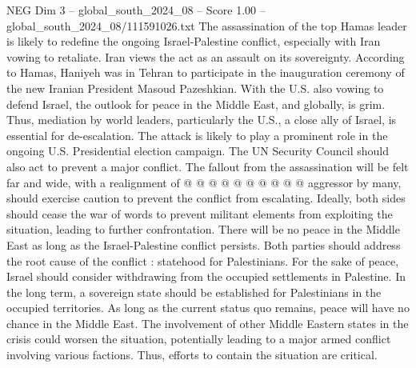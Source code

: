 \begin{textsample}{NEG Dim 3 – global\_south\_2024\_08 – Score 1.00 – global\_south\_2024\_08/111591026.txt}
The assassination of the top Hamas leader is likely to redefine the ongoing Israel-Palestine conflict, especially with Iran vowing to retaliate.
Iran views the act as an assault on its sovereignty.
According to Hamas, Haniyeh was in Tehran to participate in the inauguration ceremony of the new Iranian President Masoud Pazeshkian.
With the U.S. also vowing to defend Israel, the outlook for peace in the Middle East, and globally, is grim.
Thus, mediation by world leaders, particularly the U.S., a close ally of Israel, is essential for de-escalation.
The attack is likely to play a prominent role in the ongoing U.S.
Presidential election campaign.
The UN Security Council should also act to prevent a major conflict.
The fallout from the assassination will be felt far and wide, with a realignment of @ @ @ @ @ @ @ @ @ @ aggressor by many, should exercise caution to prevent the conflict from escalating.
Ideally, both sides should cease the war of words to prevent militant elements from exploiting the situation, leading to further confrontation.
There will be no peace in the Middle East as long as the Israel-Palestine conflict persists.
Both parties should address the root cause of the conflict : statehood for Palestinians.
For the sake of peace, Israel should consider withdrawing from the occupied settlements in Palestine.
In the long term, a sovereign state should be established for Palestinians in the occupied territories.
As long as the current status quo remains, peace will have no chance in the Middle East.
The involvement of other Middle Eastern states in the crisis could worsen the situation, potentially leading to a major armed conflict involving various factions.
Thus, efforts to contain the situation are critical.

\end{textsample}
